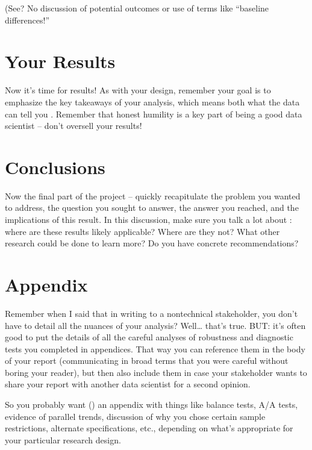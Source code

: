 \documentclass[letterpaper,10pt,english]{jupyterBook}
\begin{document}
\sphinxAtStartPar
(See? No discussion of potential outcomes or use of terms like “baseline differences!”


\section{Your Results}
\label{\detokenize{40_in_practice/25_writing_to_stakeholders:your-results}}
\sphinxAtStartPar
Now it’s time for results! As with your design, remember your goal is to emphasize the key take\sphinxhyphen{}aways of your analysis, which means both what the data can tell you . Remember that honest humility is a key part of being a good data scientist – don’t over\sphinxhyphen{}sell your results!


\section{Conclusions}
\label{\detokenize{40_in_practice/25_writing_to_stakeholders:conclusions}}
\sphinxAtStartPar
Now the final part of the project – quickly recapitulate the problem you wanted to address, the question you sought to answer, the answer you reached, and the implications of this result. In this discussion, make sure you talk a lot about : where are these results likely applicable? Where are they not? What other research could be done to learn more? Do you have concrete recommendations?


\section{Appendix}
\label{\detokenize{40_in_practice/25_writing_to_stakeholders:appendix}}
\sphinxAtStartPar
Remember when I said that in writing to a non\sphinxhyphen{}technical stakeholder, you don’t have to detail all the nuances of your analysis? Well… that’s true. BUT: it’s often good to put the details of all the careful analyses of robustness and diagnostic tests you completed in appendices. That way you can reference them in the body of your report (communicating in broad terms that you were careful without boring your reader), but then also include them in case your stakeholder wants to share your report with another data scientist for a second opinion.

\sphinxAtStartPar
So you probably want () an appendix with things like balance tests, A/A tests, evidence of parallel trends, discussion of why you chose certain sample restrictions, alternate specifications, etc., depending on what’s appropriate for your particular research design.
\end{document}
